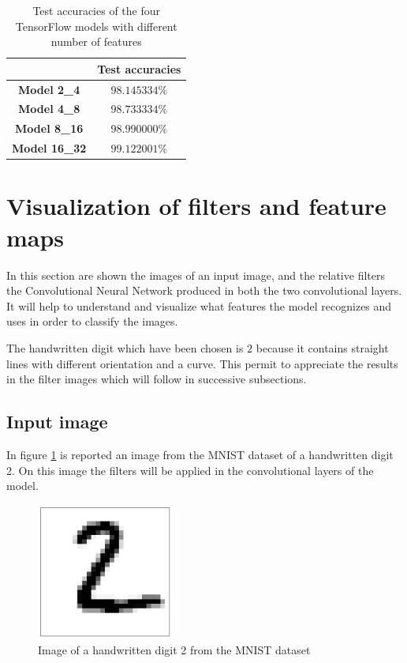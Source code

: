 \begin{table}
	\centering
	\begin{tabular}{cc}
		\hline
		& \textbf{Test accuracies} \\
		\hline
		\textbf{Model 2\_4} & $98.145334 \%$ \\
		\textbf{Model 4\_8} & $98.733334 \%$ \\
		\textbf{Model 8\_16} & $98.990000 \%$ \\
		\textbf{Model 16\_32} & $99.122001 \%$ \\
		\hline
	\end{tabular}
	\caption{Test accuracies of the four TensorFlow models with different number of features}
	\label{tab:test_accuracies}
\end{table}

\section{Visualization of filters and feature maps}

In this section are shown the images of an input image, and the relative filters the Convolutional Neural Network produced in both the two convolutional layers. It will help to understand and visualize what features the model recognizes and uses in order to classify the images.

The handwritten digit which have been chosen is $2$ because it contains straight lines with different orientation and a curve. This permit to appreciate the results in the filter images which will follow in successive subsections. 

\subsection{Input image}

In figure \ref{fig:digit_2} is reported an image from the MNIST dataset of a handwritten digit 2. On this image the filters will be applied in the convolutional layers of the model.

\begin{figure}
	\centering
	\includegraphics[width=0.4\textwidth]{Images/digit_2}
	\caption{Image of a handwritten digit 2 from the MNIST dataset}
	\label{fig:digit_2}
\end{figure}

